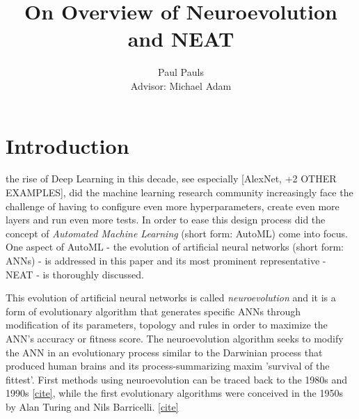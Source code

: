 \documentclass[journal, a4paper]{IEEEtran}
\begin{document}
\title{On Overview of Neuroevolution and NEAT}
\author{Paul Pauls\\
        Advisor: Michael Adam}
\maketitle




\begin{abstract}
    \blindtext
\end{abstract}




\section{Introduction}

 the rise of Deep Learning in this decade, see especially [AlexNet, +2 OTHER EXAMPLES], did the machine learning research community increasingly face the challenge of having to configure even more hyperparameters, create even more layers and run even more tests. In order to ease this design process did the concept of \textit{Automated Machine Learning} (short form: AutoML) come into focus. One aspect of AutoML - the evolution of artificial neural networks (short form: ANNs) - is addressed in this paper and its most prominent representative - NEAT - is thoroughly discussed. 

This evolution of artificial neural networks is called \textit{neuroevolution} and it is a form of evolutionary algorithm that generates specific ANNs through modification of its parameters, topology and rules in order to maximize the ANN's accuracy or fitness score. The neuroevolution algorithm seeks to modify the ANN in an evolutionary process similar to the Darwinian process that produced human brains and its process-summarizing maxim 'survival of the fittest'. First methods using neuroevolution can be traced back to the 1980s and 1990s \href{https://www.inovex.de/blog/neuroevolution/}{[cite]}, while the first evolutionary algorithms were conceived in the 1950s by Alan Turing and Nils Barricelli. \href{https://en.wikipedia.org/wiki/Genetic_algorithm#cite_note-mind.oxfordjournals.org-33}{[cite]}
\end{document}
